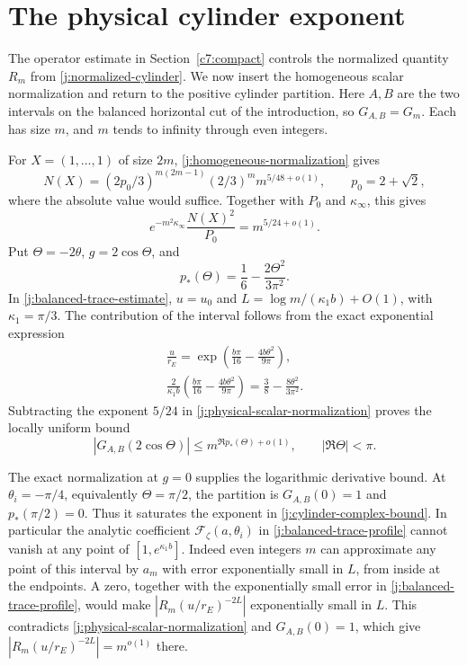 \section{The physical cylinder exponent}\label{c7:cylinder-exponent}

The operator estimate in Section~\ref{c7:compact} controls the normalized
quantity $R_m$ from \eqref{j:normalized-cylinder}. We now insert the
homogeneous scalar normalization and return to the positive cylinder
partition. Here $A,B$ are the two intervals on the balanced horizontal
cut of the introduction, so $G_{A,B}=G_m$. Each has size $m$, and $m$
tends to infinity through even integers.

For $X=(1,\ldots,1)$ of size $2m$, \eqref{j:homogeneous-normalization} gives
\[
 N(X)=(2p_0/3)^{m(2m-1)}(2/3)^m m^{5/48+o(1)},
 \qquad p_0=2+\sqrt2,
\]
where the absolute value would suffice. Together with $P_0$ and
$\kappa_\infty$, this gives
\begin{equation}\label{j:physical-scalar-normalization}
 e^{-m^2\kappa_\infty}\frac{N(X)^2}{P_0}=m^{5/24+o(1)}.
\end{equation}
Put $\Theta=-2\theta$, $g=2\cos\Theta$, and
\[
 p_*(\Theta)=\frac16-\frac{2\Theta^2}{3\pi^2}.
\]
In \eqref{j:balanced-trace-estimate}, $u=u_0$ and
$L=\log m/(\kappa_1b)+O(1)$, with $\kappa_1=\pi/3$. The contribution of
the interval follows from the exact exponential expression
\[
 \begin{gathered}
 \frac{u}{r_E}=\exp\!\left(\frac{b\pi}{16}
                    -\frac{4b\theta^2}{9\pi}\right),\\
 \frac{2}{\kappa_1b}\left(\frac{b\pi}{16}
                    -\frac{4b\theta^2}{9\pi}\right)
 =\frac38-\frac{8\theta^2}{3\pi^2}.
 \end{gathered}
\]
Subtracting the exponent $5/24$ in
\eqref{j:physical-scalar-normalization} proves the locally uniform bound
\begin{equation}\label{j:cylinder-complex-bound}
 |G_{A,B}(2\cos\Theta)|
 \le m^{\Re p_*(\Theta)+o(1)},\qquad |\Re\Theta|<\pi.
\end{equation}

The exact normalization at $g=0$ supplies the logarithmic derivative
bound. At $\theta_i=-\pi/4$, equivalently $\Theta=\pi/2$, the partition
is $G_{A,B}(0)=1$ and $p_*(\pi/2)=0$. Thus it saturates the exponent in
\eqref{j:cylinder-complex-bound}. In particular the analytic coefficient
$\mathcal F_\zeta(a,\theta_i)$ in
\eqref{j:balanced-trace-profile} cannot vanish at any point of
$[1,e^{\kappa_1b}]$. Indeed even integers $m$ can approximate any point
of this interval by $a_m$ with error exponentially small in $L$, from
inside at the endpoints. A zero, together with the exponentially small
error in \eqref{j:balanced-trace-profile}, would make
$|R_m(u/r_E)^{-2L}|$ exponentially small in $L$. This contradicts
\eqref{j:physical-scalar-normalization} and $G_{A,B}(0)=1$, which give
$|R_m(u/r_E)^{-2L}|=m^{o(1)}$ there.


